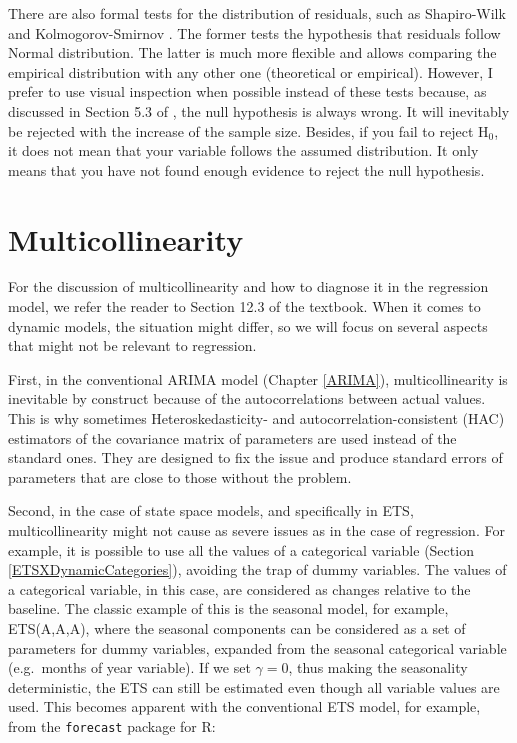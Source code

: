 \documentclass[
]{book}
\theoremstyle{definition}
\theoremstyle{definition}
\theoremstyle{definition}
\theoremstyle{definition}
\theoremstyle{remark}
\begin{document}
There are also formal tests for the distribution of residuals, such as Shapiro-Wilk \citep{WikipediaShapiroWilk2021} and Kolmogorov-Smirnov \citep{WikipediaKolmogorovSmirnov2021}. The former tests the hypothesis that residuals follow Normal distribution. The latter is much more flexible and allows comparing the empirical distribution with any other one (theoretical or empirical). However, I prefer to use visual inspection when possible instead of these tests because, as discussed in Section 5.3 of \citet{SvetunkovSBA}, the null hypothesis is always wrong. It will inevitably be rejected with the increase of the sample size. Besides, if you fail to reject H\(_0\), it does not mean that your variable follows the assumed distribution. It only means that you have not found enough evidence to reject the null hypothesis.

\hypertarget{diagnosticsMulticollinearity}{%
\section{Multicollinearity}\label{diagnosticsMulticollinearity}}

For the discussion of multicollinearity and how to diagnose it in the regression model, we refer the reader to Section 12.3 of the \citet{SvetunkovSBA} textbook. When it comes to dynamic models, the situation might differ, so we will focus on several aspects that might not be relevant to regression.

First, in the conventional ARIMA model (Chapter \ref{ARIMA}), multicollinearity is inevitable by construct because of the autocorrelations between actual values. This is why sometimes Heteroskedasticity- and autocorrelation-consistent (HAC) estimators of the covariance matrix \citep[see Section 15.4 of][]{Hanck2020} of parameters are used instead of the standard ones. They are designed to fix the issue and produce standard errors of parameters that are close to those without the problem.

Second, in the case of state space models, and specifically in ETS, multicollinearity might not cause as severe issues as in the case of regression. For example, it is possible to use all the values of a categorical variable (Section \ref{ETSXDynamicCategories}), avoiding the trap of dummy variables. The values of a categorical variable, in this case, are considered as changes relative to the baseline. The classic example of this is the seasonal model, for example, ETS(A,A,A), where the seasonal components can be considered as a set of parameters for dummy variables, expanded from the seasonal categorical variable (e.g.~months of year variable). If we set \(\gamma=0\), thus making the seasonality deterministic, the ETS can still be estimated even though all variable values are used. This becomes apparent with the conventional ETS model, for example, from the \texttt{forecast} package for R:
\end{document}
